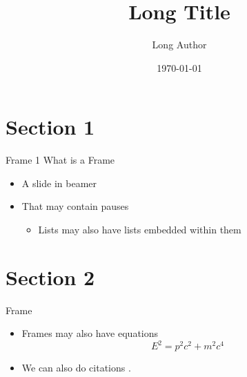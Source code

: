 \documentclass[pdf, fleqn, compress]{beamer}
\title[Short Title]{Long Title}
\author[Short Author]{Long Author}
\institute{Institution (Probably York)}
\date{\today}
\begin{document}
\begin{nonavigation}

\begin{frame}
    \titlepage
\end{frame}

\end{nonavigation}


\section{Section 1}

\begin{frame}{Frame 1}
	What is a Frame
	\begin{itemize}
		\item A slide in beamer
		\pause
		\item That may contain pauses
		\begin{itemize}
			\item Lists may also have lists embedded within them
		\end{itemize}
	\end{itemize}
\end{frame}

\section{Section 2}

\begin{frame}{Frame}
	\begin{itemize}
		\item Frames may also have equations
		\begin{equation}
			E^2 = p^2 c^2 + m^2 c^4
		\end{equation}
		\item We can also do citations \cite{knuth1986computers}.
	\end{itemize}
\end{frame}
\end{document}
